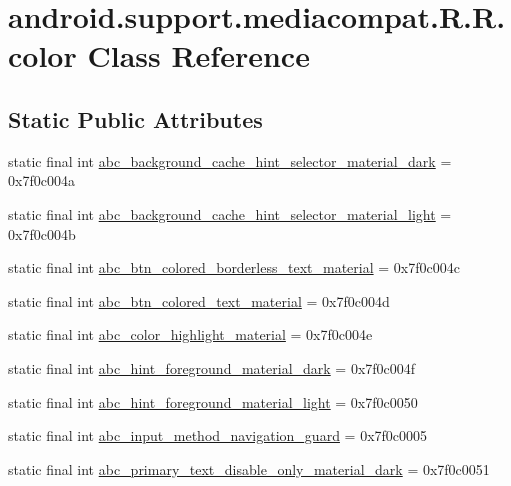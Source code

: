 \hypertarget{classandroid_1_1support_1_1mediacompat_1_1_r_1_1color}{
\section{android.support.mediacompat.R.R.color Class Reference}
\label{classandroid_1_1support_1_1mediacompat_1_1_r_1_1color}
}
\subsection*{Static Public Attributes}
\begin{CompactItemize}
\item 
static final int \hyperlink{classandroid_1_1support_1_1mediacompat_1_1_r_1_1color_10fec5da70dd3f777383920660c7beec}{abc\_\-background\_\-cache\_\-hint\_\-selector\_\-material\_\-dark} = 0x7f0c004a
\item 
static final int \hyperlink{classandroid_1_1support_1_1mediacompat_1_1_r_1_1color_e82d09f2212cb861d0adba0d5479deac}{abc\_\-background\_\-cache\_\-hint\_\-selector\_\-material\_\-light} = 0x7f0c004b
\item 
static final int \hyperlink{classandroid_1_1support_1_1mediacompat_1_1_r_1_1color_4eb3b983a5f44eaea52a06b23957a31e}{abc\_\-btn\_\-colored\_\-borderless\_\-text\_\-material} = 0x7f0c004c
\item 
static final int \hyperlink{classandroid_1_1support_1_1mediacompat_1_1_r_1_1color_2aab7baf6ca8c586583aa4022eab8804}{abc\_\-btn\_\-colored\_\-text\_\-material} = 0x7f0c004d
\item 
static final int \hyperlink{classandroid_1_1support_1_1mediacompat_1_1_r_1_1color_1adf12ebbd6e557c0e0945c5e4c91a6f}{abc\_\-color\_\-highlight\_\-material} = 0x7f0c004e
\item 
static final int \hyperlink{classandroid_1_1support_1_1mediacompat_1_1_r_1_1color_6e85b167cbffac357bad11e4b5bd49b1}{abc\_\-hint\_\-foreground\_\-material\_\-dark} = 0x7f0c004f
\item 
static final int \hyperlink{classandroid_1_1support_1_1mediacompat_1_1_r_1_1color_8527f7e440afd4464c6746e887c282fc}{abc\_\-hint\_\-foreground\_\-material\_\-light} = 0x7f0c0050
\item 
static final int \hyperlink{classandroid_1_1support_1_1mediacompat_1_1_r_1_1color_a3c28ec18afb8e7870f9e1f58adfddd8}{abc\_\-input\_\-method\_\-navigation\_\-guard} = 0x7f0c0005
\item 
static final int \hyperlink{classandroid_1_1support_1_1mediacompat_1_1_r_1_1color_2acf47366e32443a018841b71b7772da}{abc\_\-primary\_\-text\_\-disable\_\-only\_\-material\_\-dark} = 0x7f0c0051

\end{CompactItemize}
